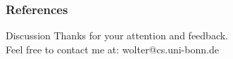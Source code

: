 \documentclass[xcolor=dvipsnames]{beamer}
\begin{document}






\begin{frame}[allowframebreaks]
        \frametitle{References}
        
        
\end{frame}


\begin{frame}{Discussion}
Thanks for your attention and feedback. \\
Feel free to contact me at: wolter@cs.uni-bonn.de
\end{frame}
\end{document}
